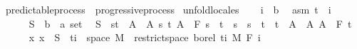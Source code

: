 \begin{isabellebody}
\isamarkupfalse%
\ predictable{\isacharunderscore}{\kern0pt}process\ {\isasymsubseteq}\ progressive{\isacharunderscore}{\kern0pt}process\isanewline
%
\isadelimproof
%
\endisadelimproof
%
\isatagproof
{}\isamarkupfalse%
\ {\isacharparenleft}{\kern0pt}unfold{\isacharunderscore}{\kern0pt}locales{\isacharparenright}{\kern0pt}\isanewline
\ \ \isamarkupfalse%
\ i\ {\isacharcolon}{\kern0pt}{\isacharcolon}{\kern0pt}\ {\isacharprime}{\kern0pt}b\ \isamarkupfalse%
\ asm{\isacharcolon}{\kern0pt}\ {\isachardoublequoteopen}t\ {\isasymle}\ i{\isachardoublequoteclose}\isanewline
\ \ \isacommand{{\isacharbraceleft}{\kern0pt}}\isamarkupfalse%
\isanewline
\ \ \ \ \isamarkupfalse%
\ S\ {\isacharcolon}{\kern0pt}{\isacharcolon}{\kern0pt}\ {\isachardoublequoteopen}{\isacharparenleft}{\kern0pt}{\isacharprime}{\kern0pt}b\ {\isasymtimes}\ {\isacharprime}{\kern0pt}a{\isacharparenright}{\kern0pt}\ set{\isachardoublequoteclose}\ \isamarkupfalse%
\ {\isachardoublequoteopen}S\ {\isasymin}\ {\isacharbraceleft}{\kern0pt}{\isacharbraceleft}{\kern0pt}s{\isacharless}{\kern0pt}{\isachardot}{\kern0pt}{\isachardot}{\kern0pt}t{\isacharbraceright}{\kern0pt}\ {\isasymtimes}\ A\ {\isacharbar}{\kern0pt}\ A\ s\ t{\isachardot}{\kern0pt}\ A\ {\isasymin}\ F\ s\ {\isasymand}\ t\ {\isasymle}\ s\ {\isasymand}\ s\ {\isacharless}{\kern0pt}\ t{\isacharbraceright}{\kern0pt}\ {\isasymunion}\ {\isacharbraceleft}{\kern0pt}{\isacharbraceleft}{\kern0pt}t\ {\isasymtimes}\ A\ {\isacharbar}{\kern0pt}\ A{\isachardot}{\kern0pt}\ A\ {\isasymin}\ F\ t\isanewline
\ \ \ \ \isamarkupfalse%
\ {\isachardoublequoteopen}{\isacharparenleft}{\kern0pt}{\isasymlambda}x{\isachardot}{\kern0pt}\ x{\isacharparenright}{\kern0pt}\ {\isacharminus}{\kern0pt}{\isacharbackquote}{\kern0pt}\ S\ {\isasyminter}\ {\isacharparenleft}{\kern0pt}{\isacharbraceleft}{\kern0pt}ti{\isacharbraceright}{\kern0pt}\ {\isasymtimes}\ space\ M{\isacharparenright}{\kern0pt}\ {\isasymin}\ restrict{\isacharunderscore}{\kern0pt}space\ borel\ {\isacharbraceleft}{\kern0pt}ti{\isacharbraceright}{\kern0pt}\ {\isasymOtimes}\isactrlsub M\ F\ i{\isachardoublequoteclose}\isanewline
\ \ \ \ \isamarkupfalse%

\end{isabellebody}
